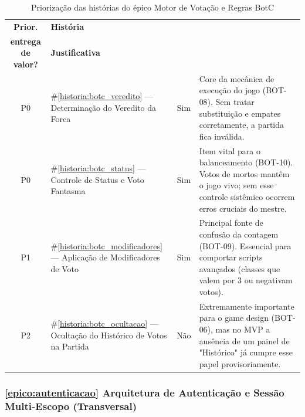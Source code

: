 \documentclass[12pt,a4paper]{article}
\newcounter{epico}
\newcounter{historia}
\begin{document}
\begin{table}[H]
\centering
\small
\begin{tabular}{|c|m{3.4cm}|c|m{6.7cm}|}
\hline
\rowcolor[gray]{0.9}
\textbf{Prior.} &
\textbf{História} &
\makecell{\textbf{Incluído na primeira}\\
\textbf{entrega de valor?}} &
\textbf{Justificativa} \\
\hline

P0 &
\#\ref{historia:botc_veredito} --- Determinação do Veredito da Forca &
Sim &
Core da mecânica de execução do jogo (BOT-08). Sem tratar substituição e empates corretamente, a partida fica inválida. \\
\hline

P0 &
\#\ref{historia:botc_status} --- Controle de Status e Voto Fantasma &
Sim &
Item vital para o balanceamento (BOT-10). Votos de mortos mantêm o jogo vivo; sem esse controle sistêmico ocorrem erros cruciais do mestre. \\
\hline

P1 &
\#\ref{historia:botc_modificadores} --- Aplicação de Modificadores de Voto &
Sim &
Principal fonte de confusão da contagem (BOT-09). Essencial para comportar scripts avançados (classes que valem por 3 ou negativam votos). \\
\hline

P2 &
\#\ref{historia:botc_ocultacao} --- Ocultação do Histórico de Votos na Partida &
Não &
Extremamente importante para o game design (BOT-06), mas no MVP a ausência de um painel de "Histórico" já cumpre esse papel provisoriamente. \\
\hline

\end{tabular}
\caption{Priorização das histórias do épico Motor de Votação e Regras BotC}
\end{table}

\subsubsection{\ref{epico:autenticacao} Arquitetura de Autenticação e Sessão Multi-Escopo (Transversal)}
\end{document}

